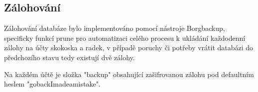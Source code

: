 \subsection{Zálohování}
Zálohování databáze bylo implementováno pomocí nástroje Borgbackup, specificky funkcí prune pro automatizaci celého procesu k ukládání každodenní zálohy na účty skokoska a radek, v případě poruchy či potřeby vrátit databázi do předchozího stavu tedy existují dvě zálohy.

Na každém účtě je složka "backup" obsahující zašifrovanou zálohu pod defaultním heslem "gobackImadeamistake".